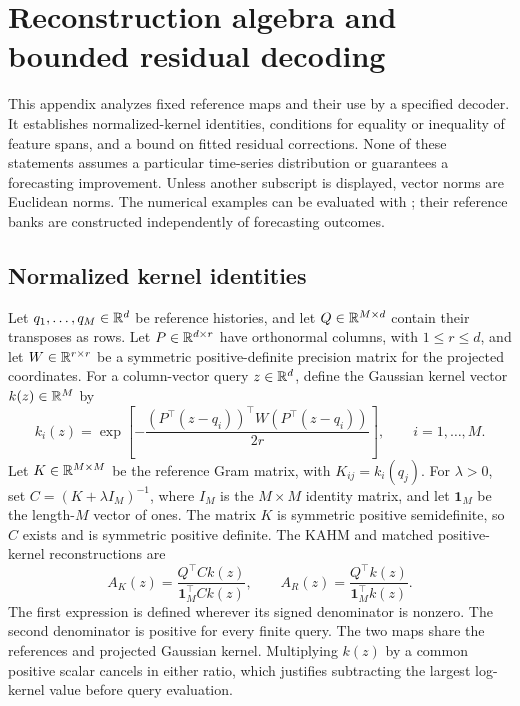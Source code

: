 \section{Reconstruction algebra and bounded residual decoding}
\label{app:reconstruction-mechanism}

This appendix analyzes fixed reference maps and their use by a specified
decoder. It establishes normalized-kernel identities, conditions for equality
or inequality of feature spans, and a bound on fitted residual corrections.
None of these statements assumes a particular time-series distribution or
guarantees a forecasting improvement. Unless another subscript is displayed,
vector norms are Euclidean norms. The numerical examples can be evaluated
with ; their reference
banks are constructed independently of forecasting outcomes.

\subsection{Normalized kernel identities}

Let $q_1,\ldots,q_M\in\mathbb{R}^d$ be reference histories, and let
$Q\in\mathbb{R}^{M\times d}$ contain their transposes as rows. Let
$P\in\mathbb{R}^{d\times r}$ have orthonormal columns, with $1\leq r\leq d$,
and let $W\in\mathbb{R}^{r\times r}$ be a symmetric positive-definite precision
matrix for the projected coordinates. For a column-vector query
$z\in\mathbb{R}^d$, define the Gaussian kernel vector $k(z)\in\mathbb{R}^M$ by
\[
 k_i(z)=\exp\!\left[-\frac{
 (P^\top(z-q_i))^\top W(P^\top(z-q_i))}{2r}\right],
 \qquad i=1,\ldots,M.
\]
Let $K\in\mathbb{R}^{M\times M}$ be the reference Gram matrix, with
$K_{ij}=k_i(q_j)$. For $\lambda>0$, set
$C=(K+\lambda I_M)^{-1}$, where $I_M$ is the $M\times M$ identity
matrix, and let $\mathbf1_M$ be the length-$M$ vector of ones.
The matrix $K$ is symmetric positive semidefinite, so $C$ exists and is
symmetric positive definite. The KAHM and matched positive-kernel
reconstructions are
\begin{equation}
 A_K(z)=\frac{Q^\top Ck(z)}{\mathbf1_M^\top Ck(z)},\qquad
 A_R(z)=\frac{Q^\top k(z)}{\mathbf1_M^\top k(z)}.
 \label{eq:mechanism-normalized-maps}
\end{equation}
The first expression is defined wherever its signed denominator is nonzero.
The second denominator is positive for every finite query. The two maps
share the references and projected Gaussian kernel. Multiplying $k(z)$
by a common positive scalar cancels in either ratio, which justifies
subtracting the largest log-kernel value before query evaluation.

